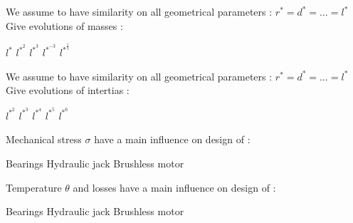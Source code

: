 \documentclass{webquiz}
\begin{document}
   \begin{question} 
     We assume to have similarity on all geometrical parameters :  $r^* = d^* = …=  l^*$ \\
    \newline
	Give evolutions of masses : 
     \begin{choice}
      \incorrect  $ l^*$
      \incorrect  $ l^{*^2}$ 
      \incorrect  $ l^{*^3}$ 
      \incorrect $ l^{*^{-3}}$ 
      \correct  $ l^{*^{\frac{1}{3}}}$ 
     \end{choice} 
   \end{question}
     \begin{question} 
   We assume to have similarity on all geometrical parameters :  $r^* = d^* = …=  l^*$ \\
    \newline
	Give evolutions of intertias : 
     \begin{choice}
      \incorrect  $ l^{*^2}$ 
      \incorrect  $ l^{*^3}$ 
         \incorrect  $ l^{*^4}$
      \incorrect $ l^{*^{5}}$ 
      \correct  $ l^{*^6}$ 
     \end{choice} 
   \end{question}
   
   \begin{question} 
 Mechanical stress $\sigma$ have a main influence on design of : \\
     \begin{choice}
      \incorrect  Bearings
      \incorrect  Hydraulic jack
         \correct  Brushless motor
     \end{choice} 
   \end{question}
   
    \begin{question} 
Temperature $\theta$ and losses have a main influence on design of : \\
     \begin{choice}
      \incorrect  Bearings
      \correct  Hydraulic jack
         \incorrect  Brushless motor
     \end{choice} 
   \end{question}
   
  
     
\end{document}
